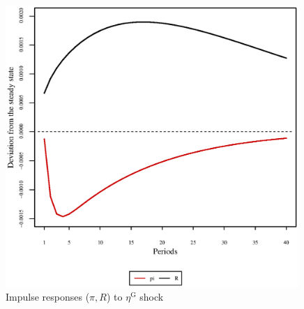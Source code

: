 \pagebreak

\begin{figure}[h]
\centering
\begin{minipage}{0.5\textwidth}
\vspace*{-3em}
\centering
\includegraphics[width=0.99\textwidth, scale=0.55]{plots/plot_150.eps}
\caption{Impulse responses ($\pi, R$) to $\eta^{\mathrm{G}}$ shock}
\end{minipage}
\end{figure}
